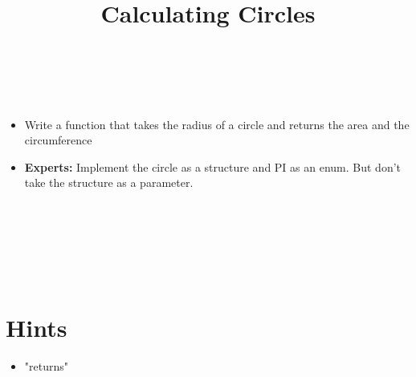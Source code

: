 

\title{Calculating Circles} %
\author{} %
\renewcommand{\difficulty}{Medium} %
\renewcommand{\requirements}{Pointers} %
\renewcommand{\aims}{return multiple values} %


 \maketitle
 \taskinfos

\ \\\ \\

\begin{itemize}
	\item Write a function that takes the radius of a circle and returns the area and the circumference
	\item \textbf{Experts:} Implement the circle as a structure and PI as an enum. But don't take the structure as a parameter.
\end{itemize}	
 
 
\ \\\ \\\ \\\ \\\ \\
\section*{Hints}
	\begin{itemize}
		\item "returns"
	\end{itemize}
 

